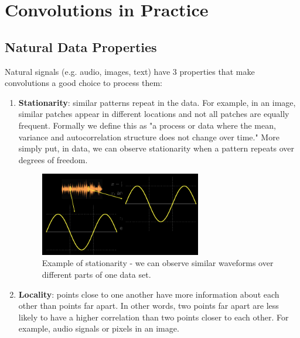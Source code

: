 \chapter{Convolutions in Practice}
    \section{Natural Data Properties}
    Natural signals (e.g. audio, images, text) have 3 properties that make convolutions a good choice to process them:
    \begin{enumerate}
        \item \textbf{Stationarity}: similar patterns repeat in the data. 
        For example, in an image, similar patches appear in different locations and not all patches are equally frequent. Formally we define this as "a process or data where the mean, variance and autocorrelation structure does not change over time." More simply put, in data, we can observe stationarity when a pattern repeats over degrees of freedom.
        
        \begin{figure}[H]
        \begin{center}
        \includegraphics[width=200pt]{figs/stationarity.png}
        \end{center} 
        \captionsetup{justification=centering, margin=2cm}
        \caption{Example of stationarity - we can observe similar waveforms over different parts of one data set.}
        \end{figure}
        
        \item \textbf{Locality}:  points close to one another have more information about each other than points far apart. 
        In other words, two points far apart are less likely to have a higher correlation than two points closer to each other. 
        For example, audio signals or pixels in an image.
        

\end{enumerate}
